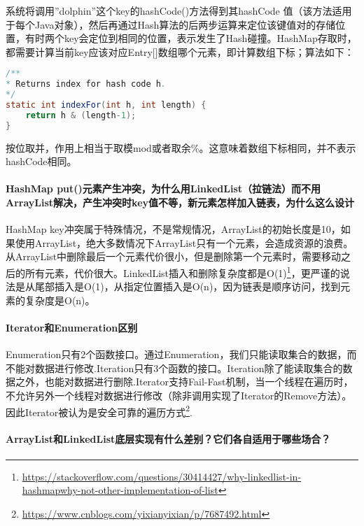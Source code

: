 \documentclass[../../../interview-questions.tex]{subfiles}
\begin{document}
系统将调用”dolphin”这个key的hashCode()方法得到其hashCode 值（该方法适用于每个Java对象），然后再通过Hash算法的后两步运算来定位该键值对的存储位置，有时两个key会定位到相同的位置，表示发生了Hash碰撞。HashMap存取时，都需要计算当前key应该对应Entry[]数组哪个元素，即计算数组下标；算法如下：

\begin{lstlisting}[language=Java]
/**
* Returns index for hash code h.
*/
static int indexFor(int h, int length) {
	return h & (length-1);
}
\end{lstlisting}

按位取并，作用上相当于取模mod或者取余\%。这意味着数组下标相同，并不表示hashCode相同。


\paragraph{HashMap put()元素产生冲突，为什么用LinkedList（拉链法）而不用ArrayList解决，产生冲突时key值不等，新元素怎样加入链表，为什么这么设计}

HashMap key冲突属于特殊情况，不是常规情况，ArrayList的初始长度是10，如果使用ArrayList，绝大多数情况下ArrayList只有一个元素，会造成资源的浪费。从ArrayList中删除最后一个元素代价很小，但是删除第一个元素时，需要移动之后的所有元素，代价很大。LinkedList插入和删除复杂度都是O(1)\footnote{\url{https://stackoverflow.com/questions/30414427/why-linkedlist-in-hashmapwhy-not-other-implementation-of-list}}，更严谨的说法是从尾部插入是O(1)，从指定位置插入是O(n)，因为链表是顺序访问，找到元素的复杂度是O(n)。

\paragraph{Iterator和Enumeration区别}

Enumeration只有2个函数接口。通过Enumeration，我们只能读取集合的数据，而不能对数据进行修改.Iteration只有3个函数的接口。Iteration除了能读取集合的数据之外，也能对数据进行删除.Iterator支持Fail-Fast机制，当一个线程在遍历时，不允许另外一个线程对数据进行修改（除非调用实现了Iterator的Remove方法）。因此Iterator被认为是安全可靠的遍历方式\footnote{\url{https://www.cnblogs.com/yixianyixian/p/7687492.html}}.


\paragraph{ArrayList和LinkedList底层实现有什么差别？它们各自适用于哪些场合？}
\end{document}
